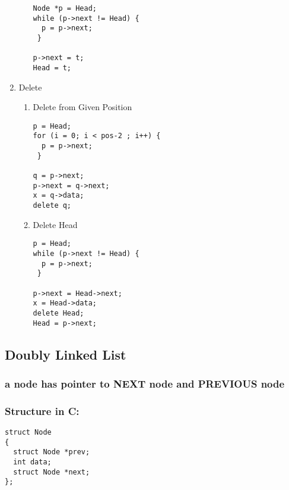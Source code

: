 \documentclass[11pt]{article}
\begin{document}
\begin{enumerate}
\begin{enumerate}
\begin{verbatim}
Node *p = Head;
while (p->next != Head) {
  p = p->next;
 }

p->next = t;
Head = t;
\end{verbatim}
\end{enumerate}
\item Delete
\label{sec:org8ad2eb4}
\begin{enumerate}
\item Delete from Given Position
\label{sec:org41b2aa5}
\begin{verbatim}
p = Head;
for (i = 0; i < pos-2 ; i++) {
  p = p->next;
 }

q = p->next;
p->next = q->next;
x = q->data;
delete q;

\end{verbatim}
\item Delete Head
\label{sec:org5b22c6c}
\begin{verbatim}
p = Head;
while (p->next != Head) {
  p = p->next;
 }

p->next = Head->next;
x = Head->data;
delete Head;
Head = p->next;
\end{verbatim}
\end{enumerate}
\end{enumerate}

\subsection{Doubly Linked List}
\label{sec:orga847e2d}
\subsubsection{a node has pointer to \textbf{NEXT} node and \textbf{PREVIOUS} node}
\label{sec:org89f5d90}
\subsubsection{Structure in C:}
\label{sec:org9ff4653}
\begin{verbatim}
struct Node
{
  struct Node *prev;
  int data;
  struct Node *next;
};
\end{verbatim}
\end{document}
